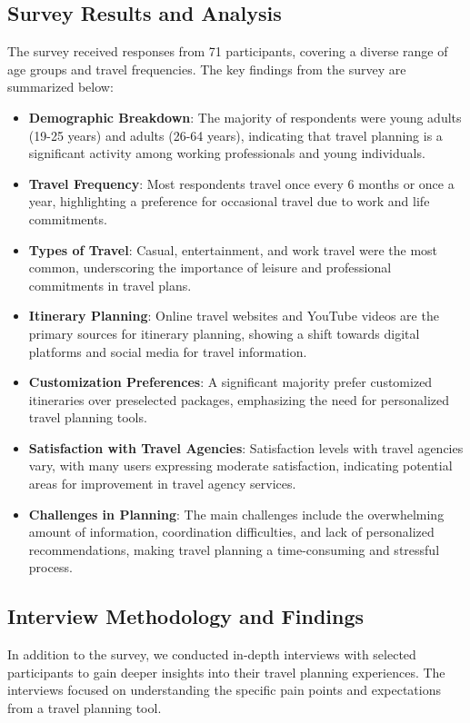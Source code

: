 \documentclass[conference]{IEEEtran}
\begin{document}
    \subsection{Survey Results and Analysis}
        The survey received responses from 71 participants, covering a diverse range of age groups and travel frequencies. The key findings from the survey are summarized below:

        \begin{itemize}
            \item \textbf{Demographic Breakdown}: The majority of respondents were young adults (19-25 years) and adults (26-64 years), indicating that travel planning is a significant activity among working professionals and young individuals.
            \item \textbf{Travel Frequency}: Most respondents travel once every 6 months or once a year, highlighting a preference for occasional travel due to work and life commitments.
            \item \textbf{Types of Travel}: Casual, entertainment, and work travel were the most common, underscoring the importance of leisure and professional commitments in travel plans.
            \item \textbf{Itinerary Planning}: Online travel websites and YouTube videos are the primary sources for itinerary planning, showing a shift towards digital platforms and social media for travel information.
            \item \textbf{Customization Preferences}: A significant majority prefer customized itineraries over preselected packages, emphasizing the need for personalized travel planning tools.
            \item \textbf{Satisfaction with Travel Agencies}: Satisfaction levels with travel agencies vary, with many users expressing moderate satisfaction, indicating potential areas for improvement in travel agency services.
            \item \textbf{Challenges in Planning}: The main challenges include the overwhelming amount of information, coordination difficulties, and lack of personalized recommendations, making travel planning a time-consuming and stressful process.
        \end{itemize}

    \subsection{Interview Methodology and Findings}
        In addition to the survey, we conducted in-depth interviews with selected participants to gain deeper insights into their travel planning experiences. The interviews focused on understanding the specific pain points and expectations from a travel planning tool.
\end{document}
